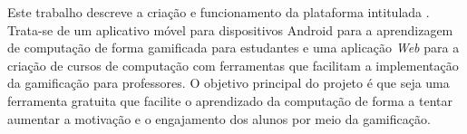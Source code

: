Este trabalho descreve a criação e funcionamento da plataforma intitulada \appName. Trata-se de um aplicativo móvel para dispositivos Android para a aprendizagem de computação de forma gamificada para estudantes e uma aplicação \textit{Web} para a criação de cursos de computação com ferramentas que facilitam a implementação da gamificação para professores. O objetivo principal do projeto é que seja uma ferramenta gratuita que facilite o aprendizado da computação de forma a tentar aumentar a motivação e o engajamento dos alunos por meio da gamificação.